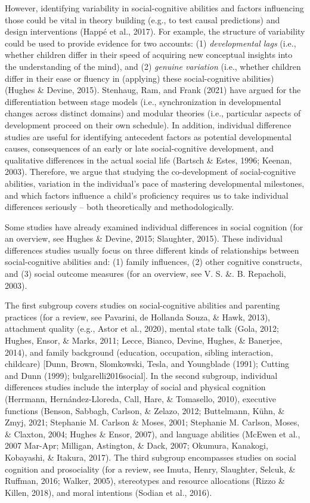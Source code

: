 \documentclass[
  man,floatsintext]{apa6}
\begin{document}
However, identifying variability in social-cognitive abilities and factors influencing those could be vital in theory building (e.g., to test causal predictions) and design interventions (Happé et al., 2017).
For example, the structure of variability could be used to provide evidence for two accounts: (1) \emph{developmental lags} (i.e., whether children differ in their speed of acquiring new conceptual insights into the understanding of the mind), and (2) \emph{genuine variation} (i.e., whether children differ in their ease or fluency in (applying) these social-cognitive abilities) (Hughes \& Devine, 2015). Stenhaug, Ram, and Frank (2021) have argued for the differentiation between stage models (i.e., synchronization in developmental changes across distinct domains) and modular theories (i.e., particular aspects of development proceed on their own schedule).
In addition, individual difference studies are useful for identifying antecedent factors as potential developmental causes, consequences of an early or late social-cognitive development, and qualitative differences in the actual social life (Bartsch \& Estes, 1996; Keenan, 2003).
Therefore, we argue that studying the co-development of social-cognitive abilities, variation in the individual's pace of mastering developmental milestones, and which factors influence a child's proficiency requires us to take individual differences seriously -- both theoretically and methodologically.

Some studies have already examined individual differences in social cognition (for an overview, see Hughes \& Devine, 2015; Slaughter, 2015).
These individual differences studies usually focus on three different kinds of relationships between social-cognitive abilities and:
(1) family influences, (2) other cognitive constructs, and (3) social outcome measures (for an overview, see V. S. \&. B. Repacholi, 2003).

The first subgroup covers studies on social-cognitive abilities and parenting practices (for a review, see Pavarini, de Hollanda Souza, \& Hawk, 2013), attachment quality (e.g., Astor et al., 2020), mental state talk (Gola, 2012; Hughes, Ensor, \& Marks, 2011; Lecce, Bianco, Devine, Hughes, \& Banerjee, 2014), and family background (education, occupation, sibling interaction, childcare) {[}Dunn, Brown, Slomkowski, Tesla, and Youngblade (1991); Cutting and Dunn (1999); bulgarelli2016social{]}.
In the second subgroup, individual differences studies include the interplay of social and physical cognition (Herrmann, Hernández-Lloreda, Call, Hare, \& Tomasello, 2010), executive functions (Benson, Sabbagh, Carlson, \& Zelazo, 2012; Buttelmann, Kühn, \& Zmyj, 2021; Stephanie M. Carlson \& Moses, 2001; Stephanie M. Carlson, Moses, \& Claxton, 2004; Hughes \& Ensor, 2007), and language abilities (McEwen et al., 2007 Mar-Apr; Milligan, Astington, \& Dack, 2007; Okumura, Kanakogi, Kobayashi, \& Itakura, 2017).
The third subgroup encompasses studies on social cognition and prosociality (for a review, see Imuta, Henry, Slaughter, Selcuk, \& Ruffman, 2016; Walker, 2005),
stereotypes and resource allocations (Rizzo \& Killen, 2018), and moral intentions (Sodian et al., 2016).
\end{document}
